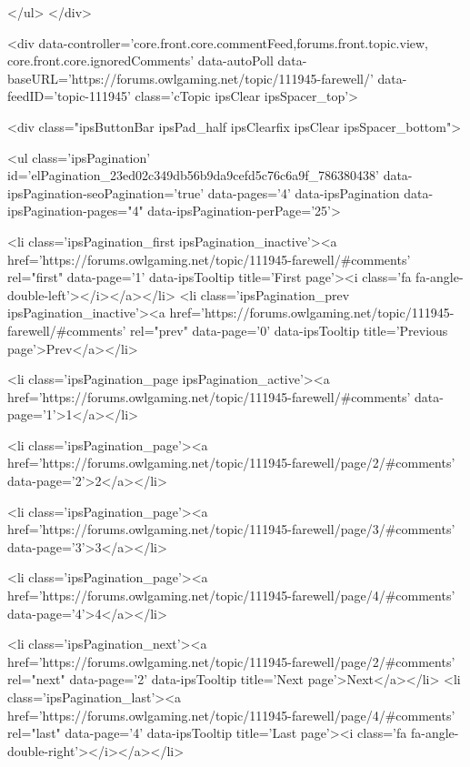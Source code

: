 	</ul>
</div>

<div data-controller='core.front.core.commentFeed,forums.front.topic.view, core.front.core.ignoredComments' data-autoPoll data-baseURL='https://forums.owlgaming.net/topic/111945-farewell/'  data-feedID='topic-111945' class='cTopic ipsClear ipsSpacer_top'>
	
		

				<div class="ipsButtonBar ipsPad_half ipsClearfix ipsClear ipsSpacer_bottom">
					
					
						


	
	<ul class='ipsPagination' id='elPagination_23ed02c349db56b9da9cefd5c76c6a9f_786380438' data-ipsPagination-seoPagination='true' data-pages='4' data-ipsPagination  data-ipsPagination-pages="4" data-ipsPagination-perPage='25'>
		
			
				<li class='ipsPagination_first ipsPagination_inactive'><a href='https://forums.owlgaming.net/topic/111945-farewell/#comments' rel="first" data-page='1' data-ipsTooltip title='First page'><i class='fa fa-angle-double-left'></i></a></li>
				<li class='ipsPagination_prev ipsPagination_inactive'><a href='https://forums.owlgaming.net/topic/111945-farewell/#comments' rel="prev" data-page='0' data-ipsTooltip title='Previous page'>Prev</a></li>
			
			<li class='ipsPagination_page ipsPagination_active'><a href='https://forums.owlgaming.net/topic/111945-farewell/#comments' data-page='1'>1</a></li>
			
				
					<li class='ipsPagination_page'><a href='https://forums.owlgaming.net/topic/111945-farewell/page/2/#comments' data-page='2'>2</a></li>
				
					<li class='ipsPagination_page'><a href='https://forums.owlgaming.net/topic/111945-farewell/page/3/#comments' data-page='3'>3</a></li>
				
					<li class='ipsPagination_page'><a href='https://forums.owlgaming.net/topic/111945-farewell/page/4/#comments' data-page='4'>4</a></li>
				
				<li class='ipsPagination_next'><a href='https://forums.owlgaming.net/topic/111945-farewell/page/2/#comments' rel="next" data-page='2' data-ipsTooltip title='Next page'>Next</a></li>
				<li class='ipsPagination_last'><a href='https://forums.owlgaming.net/topic/111945-farewell/page/4/#comments' rel="last" data-page='4' data-ipsTooltip title='Last page'><i class='fa fa-angle-double-right'></i></a></li>
			
